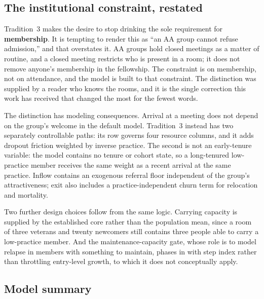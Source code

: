 \documentclass[11pt,a4paper]{article}
\begin{document}
\subsection{The institutional constraint, restated}

Tradition~3 makes the desire to stop drinking the sole requirement for
\textbf{membership}. It is tempting to render this as ``an AA group cannot refuse
admission,'' and that overstates it. AA groups hold closed meetings as a matter of
routine, and a closed meeting restricts who is present in a room; it does not
remove anyone's membership in the fellowship. The constraint is on membership, not
on attendance, and the model is built to that constraint. The distinction was
supplied by a reader who knows the rooms, and it is the single correction this
work has received that changed the most for the fewest words.

The distinction has modeling consequences. Arrival at a meeting does not depend on
the group's welcome in the default model. Tradition~3 instead has two separately
controllable paths: its row governs four resource columns, and it adds dropout
friction weighted by inverse practice. The second is not an early-tenure variable:
the model contains no tenure or cohort state, so a long-tenured low-practice member
receives the same weight as a recent arrival at the same practice. Inflow contains
an exogenous referral floor independent of the group's attractiveness; exit also
includes a practice-independent churn term for relocation and mortality.

Two further design choices follow from the same logic. Carrying capacity is
supplied by the established core rather than the population mean, since a room of
three veterans and twenty newcomers still contains three people able to carry a
low-practice member. And the maintenance-capacity gate, whose role is to model relapse in
members with something to maintain, phases in with step index rather than
throttling entry-level growth, to which it does not conceptually apply.

\subsection{Model summary}
\end{document}
